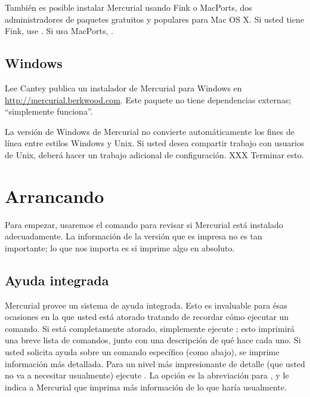 También es posible instalar Mercurial usando Fink o MacPorts, dos
administradores de paquetes gratuitos y populares para Mac OS X. Si
usted tiene Fink, use .
Si usa MacPorts, .

\subsection{Windows}

Lee Cantey publica un instalador de Mercurial para Windows en
\url{http://mercurial.berkwood.com}. Este paquete no tiene
dependencias externas; ``simplemente funciona''.

\begin{note}
    La versión de Windows de Mercurial no convierte automáticamente
    los fines de línea entre estilos Windows y Unix. Si usted desea
    compartir trabajo con usuarios de Unix, deberá hacer un trabajo
    adicional de configuración. XXX Terminar esto.
\end{note}

\section{Arrancando}

Para empezar, usaremos el comando  para revisar si
Mercurial está instalado adecuadamente. La información de la versión
que es impresa no es tan importante; lo que nos importa es si imprime
algo en absoluto.


\subsection{Ayuda integrada}

Mercurial provee un sistema de ayuda integrada. Esto es invaluable
para ésas ocasiones en la que usted está atorado tratando de recordar
cómo ejecutar un comando. Si está completamente atorado, simplemente
ejecute ; esto imprimirá una breve lista de comandos,
junto con una descripción de qué hace cada uno. Si usted solicita
ayuda sobre un comando específico (como abajo), se imprime información
más detallada.
Para un nivel más impresionante de detalle (que usted no va a
necesitar usualmente) ejecute . La opción
 es la abreviación para , y le indica a
Mercurial que imprima más información de lo que haría usualmente.


